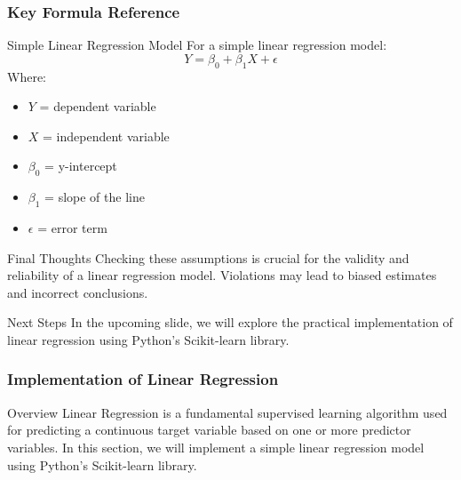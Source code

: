\documentclass[aspectratio=169]{beamer}
\begin{document}
\begin{frame}[fragile]
    \frametitle{Key Formula Reference}
    \begin{block}{Simple Linear Regression Model}
        For a simple linear regression model:
        \begin{equation}
            Y = \beta_0 + \beta_1 X + \epsilon
        \end{equation}
        Where:
        \begin{itemize}
            \item $Y$ = dependent variable
            \item $X$ = independent variable
            \item $\beta_0$ = y-intercept
            \item $\beta_1$ = slope of the line
            \item $\epsilon$ = error term
        \end{itemize}
    \end{block}
    
    \begin{block}{Final Thoughts}
        Checking these assumptions is crucial for the validity and reliability of a linear regression model. Violations may lead to biased estimates and incorrect conclusions.
    \end{block}

    \begin{block}{Next Steps}
        In the upcoming slide, we will explore the practical implementation of linear regression using Python's Scikit-learn library.
    \end{block}
\end{frame}

\begin{frame}
    \frametitle{Implementation of Linear Regression}
    \begin{block}{Overview}
        Linear Regression is a fundamental supervised learning algorithm used for predicting a continuous target variable based on one or more predictor variables. In this section, we will implement a simple linear regression model using Python's Scikit-learn library.
    \end{block}
\end{frame}
\end{document}
